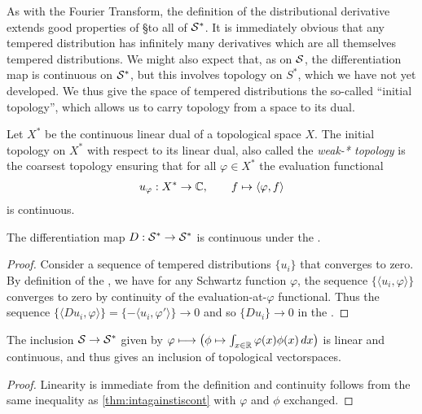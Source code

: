     As with the Fourier Transform, the definition of the distributional derivative extends good properties of \S to all of $\S^*$.
    It is immediately obvious that any tempered distribution has infinitely many derivatives which are all themselves tempered distributions.
    We might also expect that, as on $\S$, the differentiation map is continuous on $\S^*$, but this involves topology on $S^*$, which we have not yet developed.
    We thus give the space of tempered distributions the so-called ``initial topology'', which allows us to carry topology from a space to its dual.
    \begin{defn}
      Let $X^*$ be the continuous linear dual of a topological space $X$.
      The initial topology on $X^*$ with respect to its linear dual, also called the \emph{weak-* topology} is the coarsest topology ensuring that for all $\varphi\in X^*$ the evaluation functional
      \begin{gather*}
        u_\varphi: X^*\rightarrow\C, \qquad f\mapsto\langle\varphi,f\rangle
      \end{gather*}
      is continuous.
    \end{defn}

    \begin{claim}
      The differentiation map $D:\SS\rightarrow\SS$ is continuous under the \ws.
    \end{claim}
    \begin{proof}
      Consider a sequence of tempered distributions $\{u_i\}$ that converges to zero.
      By definition of the \ws, we have for any Schwartz function $\varphi$, the sequence $\{\langle u_i,\varphi\rangle\}$ converges to zero by continuity of the evaluation-at-$\varphi$ functional.
      Thus the sequence $ \{\langle Du_i, \varphi\rangle\} = \{-\langle u_i, \varphi'\rangle\} \rightarrow 0 $ and so $\{Du_i\}\rightarrow 0$ in the \ws.
    \end{proof}

    \begin{thm}
      The inclusion $\S\rightarrow\SS$ given by $\varphi\longmapsto\left( \phi\mapsto \int_{x\in\R} \varphi(x)\phi(x)\,dx \right)$ is linear and continuous, and thus gives an inclusion of topological vectorspaces.
    \end{thm}
    \begin{proof}
      Linearity is immediate from the definition and continuity follows from the same inequality as \cref{thm:intagainstiscont} with $\varphi$ and $\phi$ exchanged.
    \end{proof}

